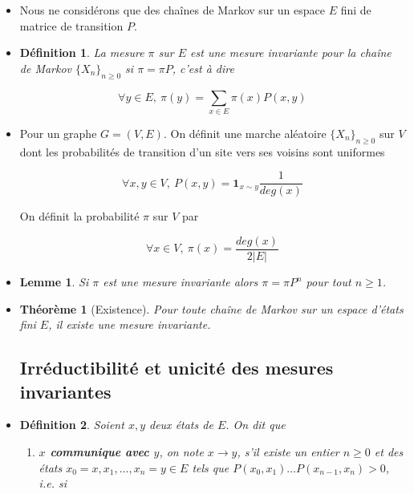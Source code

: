 \documentclass[10pt,a4paper,oneside]{article}
\newtheorem{theoreme}{Théorème}
\newtheorem{lemme}{Lemme}
\newtheorem{definition}{Définition}
\begin{document}
\begin{itemize}

\item
Nous ne considérons que des chaînes de Markov sur un espace $E$ fini de matrice de transition $P$.

\item
\begin{definition}
La mesure $\pi$ sur $E$ est une mesure invariante pour la chaîne de Markov $\{ X_n \}_{n \geq 0}$ si $\pi = \pi P$, c'est à dire

\[ \forall y \in E,\ \pi(y) = \sum_{x \in E} \pi(x) P(x,y) \]
\end{definition}

\item
Pour un graphe $G = (V,E)$. On définit une marche aléatoire $\{ X_n \}_{n \geq 0}$ sur $V$ dont les probabilités de transition d'un site vers ses voisins sont uniformes

\[ \forall x,y \in V,\ P(x,y) = \textbf{1}_{x \sim y}\frac{1}{deg(x)} \]

On définit la probabilité $\pi$ sur $V$ par

\[ \forall x \in V,\ \pi(x) = \frac{deg(x)}{2|E|} \]

\item
\begin{lemme}
Si $\pi$ est une mesure invariante alors $\pi = \pi P^n$ pour tout $n \geq 1$.
\end{lemme}

\item
\begin{theoreme}[Existence]
Pour toute chaîne de Markov sur un espace d'états fini $E$, il existe une mesure invariante.
\end{theoreme}

\subsection{Irréductibilité et unicité des mesures invariantes}

\item
\begin{definition}
Soient $x,y$ deux états de $E$. On dit que

\begin{enumerate}
\item
\textbf{$x$ communique avec $y$}, on note $x \to y$, s'il existe un entier $n \geq 0$ et des états $x_0 = x,x_1,\ldots,x_n = y \in E$ tels que $P(x_0,x_1) \ldots P(x_{n - 1},x_n) > 0$, i.e. si


\end{enumerate}
\end{definition}
\end{itemize}
\end{document}
